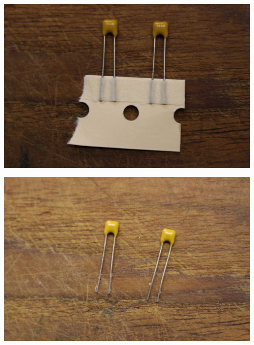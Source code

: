 \documentclass{article}
\begin{document}
\vspace{1cm}

\begin{minipage}[b]{0.5\textwidth}
	\includegraphics[width=\textwidth]{Bilder/IMG_5546.JPG}
\end{minipage}
\begin{minipage}[b]{0.5\textwidth}
	\includegraphics[width=\textwidth]{Bilder/IMG_5547.JPG}
\end{minipage}

\vspace{0.5cm}
\end{document}
